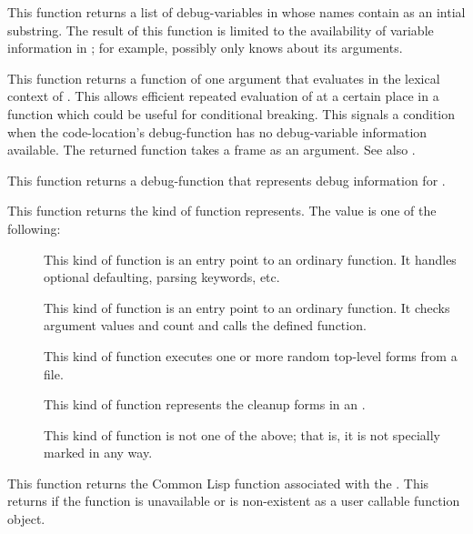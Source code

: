 {
This function returns a list of debug-variables in  whose
names contain  as an intial substring.  The result of
this function is limited to the availability of variable information in
; for example, possibly  only knows
about its arguments.
\enddefun


This function returns a function of one argument that evaluates  in
the lexical context of .  This allows efficient
repeated evaluation of  at a certain place in a function which could
be useful for conditional breaking.  This signals a 
condition when the code-location's debug-function has no debug-variable
information available.  The returned function takes a frame as an
argument.  See also .
\enddefun


This function returns a debug-function that represents debug information for
.
\enddefun


This function returns the kind of function  represents.
The value is one of the following:
\begin{description}
\item[]
This kind of function is an entry point to an ordinary function.  It handles
optional defaulting, parsing keywords, etc.
\item[]
This kind of function is an entry point to an ordinary function.  It checks
argument values and count and calls the defined function.
\item[]
This kind of function executes one or more random top-level forms
from a file.
\item[]
This kind of function represents the cleanup forms in an .
\item[\nil]
This kind of function is not one of the above; that is, it is not specially
marked in any way.
\end{description}
\enddefun


This function returns the Common Lisp function associated with the 
.  This returns \nil if the function is unavailable or is
non-existent as a user callable function object.
\enddefun


}
